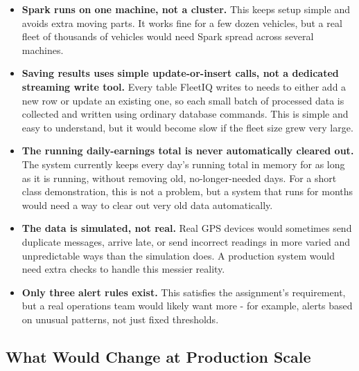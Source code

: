 \documentclass[12pt,a4paper]{article}
\begin{document}
\begin{itemize}
  \item \textbf{Spark runs on one machine, not a cluster.} This keeps setup
    simple and avoids extra moving parts. It works fine for a few dozen
    vehicles, but a real fleet of thousands of vehicles would need Spark
    spread across several machines.
  \item \textbf{Saving results uses simple update-or-insert calls, not a
    dedicated streaming write tool.} Every table FleetIQ writes to needs to
    either add a new row or update an existing one, so each small batch of
    processed data is collected and written using ordinary database
    commands. This is simple and easy to understand, but it would become
    slow if the fleet size grew very large.
  \item \textbf{The running daily-earnings total is never automatically
    cleared out.} The system currently keeps every day's running total in
    memory for as long as it is running, without removing old, no-longer-needed
    days. For a short class demonstration, this is not a problem, but a
    system that runs for months would need a way to clear out very old data
    automatically.
  \item \textbf{The data is simulated, not real.} Real GPS devices would
    sometimes send duplicate messages, arrive late, or send incorrect
    readings in more varied and unpredictable ways than the simulation
    does. A production system would need extra checks to handle this
    messier reality.
  \item \textbf{Only three alert rules exist.} This satisfies the
    assignment's requirement, but a real operations team would likely want
    more - for example, alerts based on unusual patterns, not just fixed
    thresholds.
\end{itemize}

\subsection{What Would Change at Production Scale}
\end{document}
